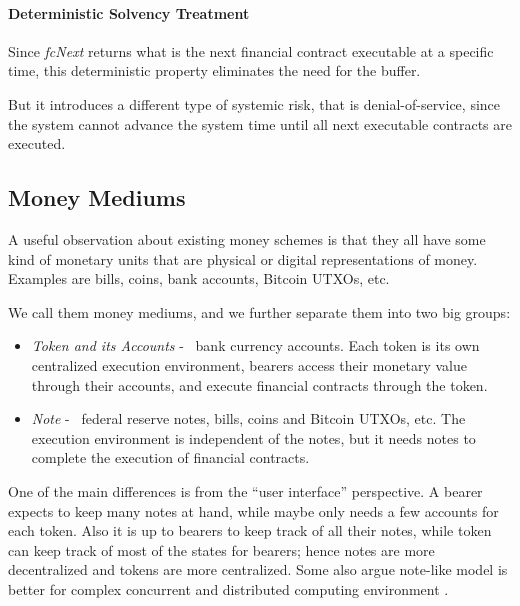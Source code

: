 \paragraph{Deterministic Solvency Treatment}

Since \textit{fcNext} returns what is the next financial contract executable at a specific time, this deterministic
property eliminates the need for the buffer.

But it introduces a different type of systemic risk, that is denial-of-service, since the system cannot advance the
system time until all next executable contracts are executed.


\subsection{Money Mediums}

\begin{displayquote}
A useful observation about existing money schemes is that they all have some kind of monetary units that are physical or
digital representations of money. Examples are bills, coins, bank accounts, Bitcoin UTXOs,
etc. 
\end{displayquote}

We call them money mediums, and we further separate them into two big groups:

\begin{itemize}
\item \textit{Token and its Accounts} - \eg\ bank currency accounts. Each token is its own centralized execution
    environment, bearers access their monetary value through their accounts, and execute financial contracts through the
    token.
\item \textit{Note} - \eg\ federal reserve notes, bills, coins and Bitcoin UTXOs, etc. The execution environment is
    independent of the notes, but it needs notes to complete the execution of financial contracts.
\end{itemize}

One of the main differences is from the ``user interface'' perspective. A bearer expects to keep many notes at hand,
while maybe only needs a few accounts for each token. Also it is up to bearers to keep track of all their notes, while
token can keep track of most of the states for bearers; hence notes are more decentralized and tokens are more
centralized. Some also argue note-like model is better for complex concurrent and distributed computing environment
.


